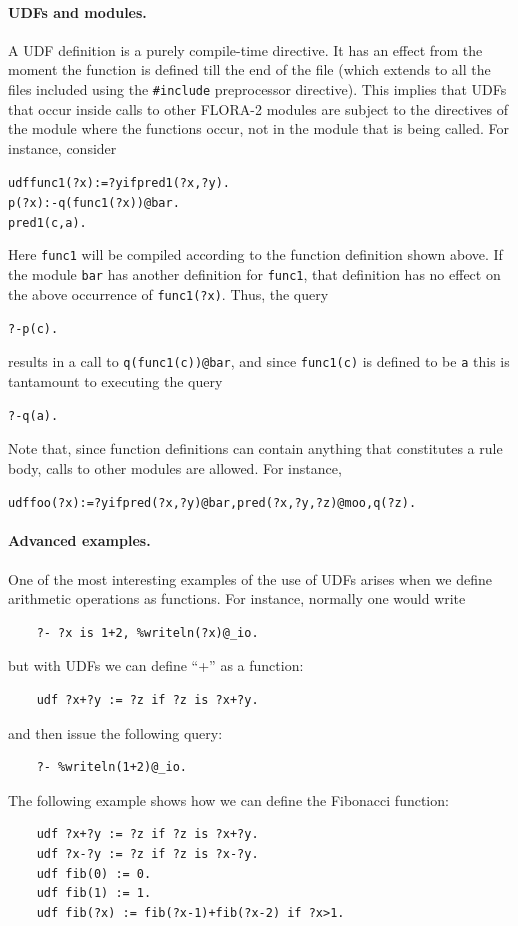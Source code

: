 \documentclass[11pt]{article}
\begin{document}
\paragraph{UDFs and modules.}
A UDF definition is a purely compile-time directive. It has an effect from
the moment the function is defined till the end of the file (which extends to
all the files included using the \texttt{\#include} preprocessor
directive). This implies that UDFs that occur inside calls to other FLORA-2
modules are subject to the directives of the module where the functions
occur, not in the module that is being called. For instance, consider
\begin{alltt}
    udf func1(?x) := ?y if pred1(?x,?y).
    p(?x) :- q(func1(?x))@bar.
    pred1(c,a).
\end{alltt}
Here \texttt{func1} will be compiled according to the function definition
shown above. If the module \texttt{bar} has another definition for
\texttt{func1}, that definition has no effect on the above occurrence of
\texttt{func1(?x)}.   Thus, the query
\begin{alltt}
?- p(c).
\end{alltt}
results in a call to \texttt{q(func1(c))@bar}, and since \texttt{func1(c)} is
defined to be \texttt{a} this is tantamount to executing the query  
\begin{alltt}
?- q(a).
\end{alltt}
Note that, since function definitions can contain anything that constitutes
a rule body, calls to other modules are allowed. For instance, 
\begin{alltt}
    udf foo(?x):=?y if pred(?x,?y)@bar, pred(?x,?y,?z)@moo, q(?z).
\end{alltt}

\paragraph{Advanced examples.}
One of the most interesting examples of the use of UDFs arises when we
define arithmetic operations as functions. For instance, normally one would
write
\begin{verbatim}
    ?- ?x is 1+2, %writeln(?x)@_io.
\end{verbatim}
but with UDFs we can define ``+'' as a function:
\begin{verbatim}
    udf ?x+?y := ?z if ?z is ?x+?y.
\end{verbatim}
and then issue the following query:
\begin{verbatim}
    ?- %writeln(1+2)@_io.
\end{verbatim}
The following example shows how we can define the Fibonacci function:
\begin{verbatim}
    udf ?x+?y := ?z if ?z is ?x+?y.
    udf ?x-?y := ?z if ?z is ?x-?y.
    udf fib(0) := 0.
    udf fib(1) := 1.
    udf fib(?x) := fib(?x-1)+fib(?x-2) if ?x>1.
\end{verbatim}
\end{document}

